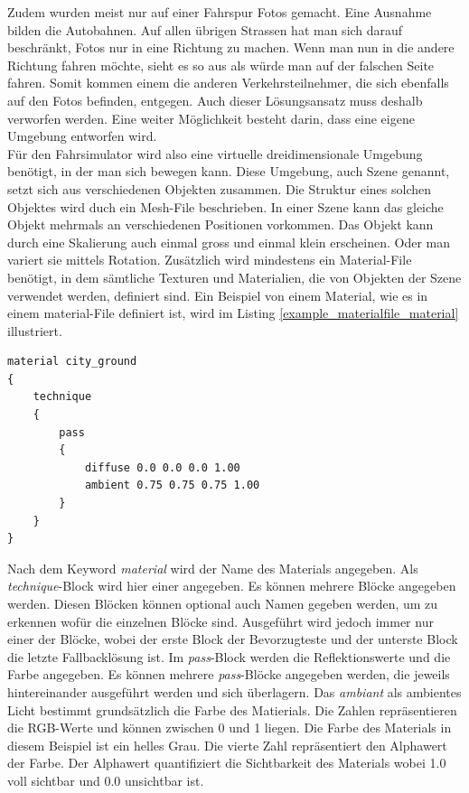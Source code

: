 Zudem wurden meist nur auf einer Fahrspur Fotos gemacht. Eine Ausnahme bilden die Autobahnen. Auf allen übrigen Strassen hat man sich darauf beschränkt, Fotos nur in eine Richtung zu machen. Wenn man nun in die andere Richtung fahren möchte, sieht es so aus als würde man auf der falschen Seite fahren. Somit kommen einem die anderen Verkehrsteilnehmer, die sich ebenfalls auf den Fotos befinden, entgegen. Auch dieser Lösungsansatz muss deshalb verworfen werden. Eine weiter Möglichkeit besteht darin, dass eine eigene Umgebung entworfen wird.\\
Für den Fahrsimulator wird also eine virtuelle dreidimensionale Umgebung benötigt, in der man sich bewegen kann. Diese Umgebung, auch Szene genannt, setzt sich aus verschiedenen Objekten zusammen. Die Struktur eines solchen Objektes wird duch ein Mesh-File beschrieben. In einer Szene kann das gleiche Objekt mehrmals an verschiedenen Positionen vorkommen. Das Objekt kann durch eine Skalierung auch einmal gross und einmal klein erscheinen. Oder man variert sie mittels Rotation. Zusätzlich wird mindestens ein Material-File benötigt, in dem sämtliche Texturen und Materialien, die von Objekten der Szene verwendet werden, definiert sind.
Ein Beispiel von einem Material, wie es in einem material-File definiert ist, wird im Listing \ref{example_materialfile_material} illustriert.
\begin{lstlisting}[caption={Beispiel aus dem material-File für ein Material},label={example_materialfile_material}]
material city_ground
{
	technique
	{
		pass
		{
			diffuse 0.0 0.0 0.0 1.00
			ambient 0.75 0.75 0.75 1.00	
		}
	}
}
\end{lstlisting}
Nach dem Keyword \textit{material} wird der Name des Materials angegeben. Als \textit{technique}-Block wird hier einer angegeben. Es können mehrere Blöcke angegeben werden. Diesen Blöcken können optional auch Namen gegeben werden, um zu erkennen wofür die einzelnen Blöcke sind. Ausgeführt wird jedoch immer nur einer der Blöcke, wobei der erste Block der Bevorzugteste und der unterste Block die letzte Fallbacklösung ist. Im \textit{pass}-Block werden die Reflektionswerte und die Farbe angegeben. Es können mehrere \textit{pass}-Blöcke angegeben werden, die jeweils hintereinander ausgeführt werden und sich überlagern. Das \textit{ambiant} als ambientes Licht bestimmt grundsätzlich die Farbe des Matierials. Die Zahlen repräsentieren die RGB-Werte und können zwischen 0 und 1 liegen. Die Farbe des Materials in diesem Beispiel ist ein helles Grau. Die vierte Zahl repräsentiert den Alphawert der Farbe. Der Alphawert quantifiziert die Sichtbarkeit des Materials wobei 1.0 voll sichtbar und 0.0 unsichtbar ist.
